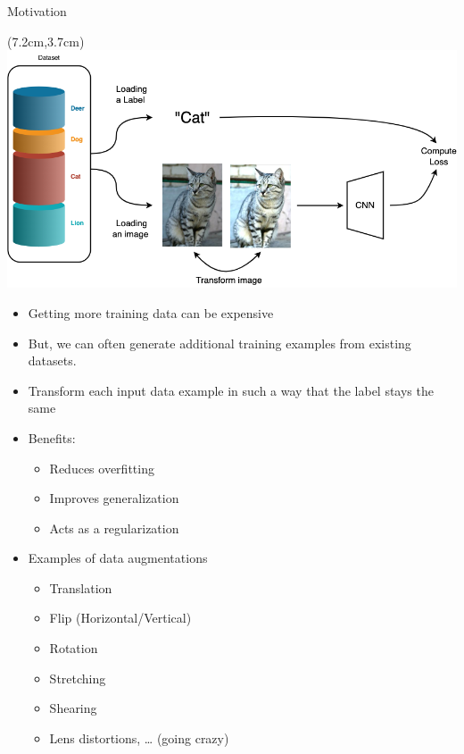 \documentclass[serif, aspectratio=169]{beamer}
\begin{document}
\begin{frame}{Motivation}
	\begin{textblock*}{5cm}(7.2cm,3.7cm) %
		\includegraphics[keepaspectratio, scale=0.28]{pic/cnnaug}
	\end{textblock*}
	
	\begin{itemize}
		\item Getting more training data can be expensive
		\item But, we can often generate additional training examples from existing datasets.
		\item Transform each input data example in such a way that the label stays the same
		\item Benefits:
		\begin{itemize}
			\item Reduces overfitting 
			\item Improves generalization
			\item Acts as a regularization
		\end{itemize}
		\item Examples of data augmentations
		\begin{itemize}
			\item Translation
			\item Flip (Horizontal/Vertical)
			\item Rotation
			\item Stretching
			\item Shearing
			\item Lens distortions, … (going crazy)
		\end{itemize}
	\end{itemize}
\end{frame}
\end{document}
